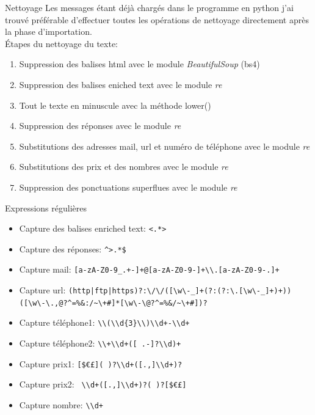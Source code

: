 \documentclass[xelatex,11pt, xcolor=dvipsnames]{beamer}
\begin{document}
\begin{frame}{Nettoyage}
  Les messages étant déjà chargés dans le programme en python j'ai trouvé préférable d'effectuer toutes les opérations de nettoyage directement après la phase d'importation. \\
  
	Étapes du nettoyage du texte:
	\begin{enumerate}
		\item Suppression des balises html avec le module \emph{BeautifulSoup} (bs4)
		\item Suppression des balises eniched text avec le module \emph{re}
		\item Tout le texte en minuscule avec la méthode lower()
		\item Suppression des réponses avec le module \emph{re}
		\item Substitutions des adresses mail, url et numéro de téléphone avec le module \emph{re}
		\item Substitutions des prix et des nombres avec le module \emph{re}
		\item Suppression des ponctuations superflues avec le module \emph{re}
	\end{enumerate}

\end{frame}
	
\begin{frame}[fragile]{Expressions régulières}
	\begin{itemize}
		\item Capture des balises enriched text: \verb'<.*>'
		\item Capture des réponses: \verb'^>.*$'
		\item Capture mail: \verb'[a-zA-Z0-9_.+-]+@[a-zA-Z0-9-]+\\.[a-zA-Z0-9-.]+'
		\item Capture url: \verb'(http|ftp|https)?:\/\/([\w\-_]+(?:(?:\.[\w\-_]+)+))'
							\verb'([\w\-\.,@?^=%&:/~\+#]*[\w\-\@?^=%&/~\+#])?'
		\item Capture téléphone1: \verb'\\(\\d{3}\\)\\d+-\\d+'
		\item Capture téléphone2: \verb'\\+\\d+([ .-]?\\d)+'
		\item Capture prix1: \verb'[$€£]( )?\\d+([.,]\\d+)? '
		\item Capture prix2: \verb' \\d+([.,]\\d+)?( )?[$€£]'
		\item Capture nombre: \verb'\\d+'
	\end{itemize}
\end{frame}
\end{document}
